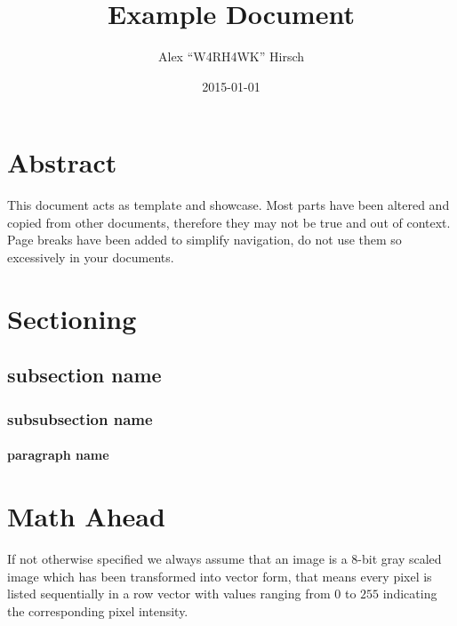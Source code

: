 \documentclass{itsarticle}
\title{Example Document}
\author{Alex ``W4RH4WK'' Hirsch}
\date{2015-01-01}
\begin{document}
\maketitle

\section*{Abstract}
\label{sec:abstract}

This document acts as template and showcase. Most parts have been altered and
copied from other documents, therefore they may not be true and out of context.
Page breaks have been added to simplify navigation, do not use them so
excessively in your documents.

\tableofcontents

\newpage

\section{Sectioning}
\label{sec:sectioning}

\lipsum[3]

\subsection{subsection name}
\label{sub:subsection_name}

\lipsum[2]

\lipsum[3]

\subsubsection{subsubsection name}
\label{ssub:subsubsection_name}

\lipsum[3]

\paragraph{paragraph name}
\label{par:paragraph_name}

\lipsum[3]

\newpage

\section{Math Ahead}
\label{sec:math_ahead}

\begin{notation}
    If not otherwise specified we always assume that an image is a 8-bit gray
    scaled image which has been transformed into vector form, that means every
    pixel is listed sequentially in a row vector with values ranging from $0$
    to $255$ indicating the corresponding pixel intensity.
\end{notation}
\end{document}
